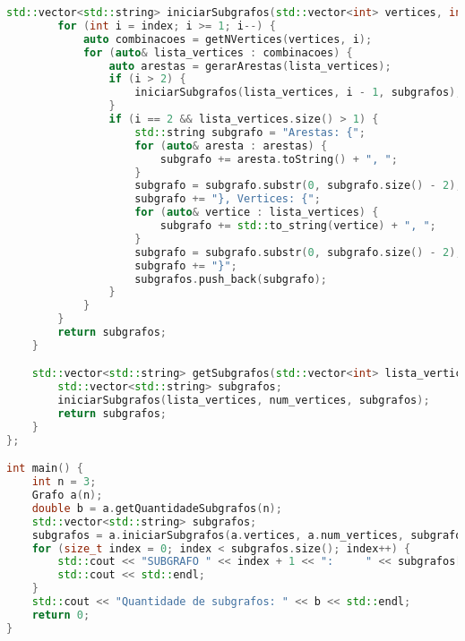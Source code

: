 \documentclass{article}
\begin{document}
\begin{lstlisting}[language=C++, basicstyle=\ttfamily\small, breaklines=true, keywordstyle=\color{blue}]
    std::vector<std::string> iniciarSubgrafos(std::vector<int> vertices, int index, std::vector<std::string>& subgrafos) {
        for (int i = index; i >= 1; i--) {
            auto combinacoes = getNVertices(vertices, i);
            for (auto& lista_vertices : combinacoes) {
                auto arestas = gerarArestas(lista_vertices);
                if (i > 2) {
                    iniciarSubgrafos(lista_vertices, i - 1, subgrafos);
                }
                if (i == 2 && lista_vertices.size() > 1) {
                    std::string subgrafo = "Arestas: {";
                    for (auto& aresta : arestas) {
                        subgrafo += aresta.toString() + ", ";
                    }
                    subgrafo = subgrafo.substr(0, subgrafo.size() - 2);
                    subgrafo += "}, Vertices: {";
                    for (auto& vertice : lista_vertices) {
                        subgrafo += std::to_string(vertice) + ", ";
                    }
                    subgrafo = subgrafo.substr(0, subgrafo.size() - 2);
                    subgrafo += "}";
                    subgrafos.push_back(subgrafo);
                }
            }
        }
        return subgrafos;
    }

    std::vector<std::string> getSubgrafos(std::vector<int> lista_vertices) {
        std::vector<std::string> subgrafos;
        iniciarSubgrafos(lista_vertices, num_vertices, subgrafos);
        return subgrafos;
    }
};

int main() {
    int n = 3;
    Grafo a(n);
    double b = a.getQuantidadeSubgrafos(n);
    std::vector<std::string> subgrafos;
    subgrafos = a.iniciarSubgrafos(a.vertices, a.num_vertices, subgrafos);
    for (size_t index = 0; index < subgrafos.size(); index++) {
        std::cout << "SUBGRAFO " << index + 1 << ":     " << subgrafos[index] << std::endl;
        std::cout << std::endl;
    }
    std::cout << "Quantidade de subgrafos: " << b << std::endl;
    return 0;
}
\end{lstlisting}
\end{document}
